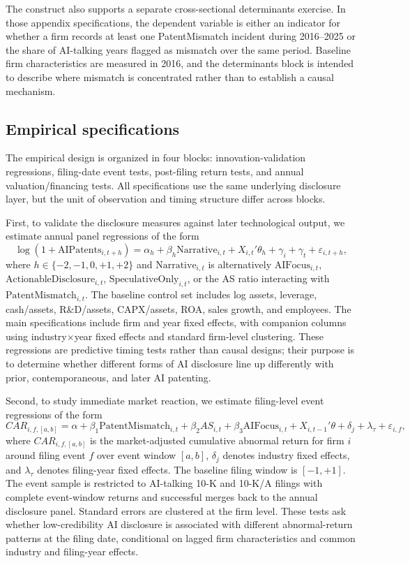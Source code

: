 The construct also supports a separate cross-sectional determinants exercise. In those appendix specifications, the dependent variable is either an indicator for whether a firm records at least one PatentMismatch incident during 2016--2025 or the share of AI-talking years flagged as mismatch over the same period. Baseline firm characteristics are measured in 2016, and the determinants block is intended to describe where mismatch is concentrated rather than to establish a causal mechanism.

\subsection{Empirical specifications}

The empirical design is organized in four blocks: innovation-validation regressions, filing-date event tests, post-filing return tests, and annual valuation/financing tests. All specifications use the same underlying disclosure layer, but the unit of observation and timing structure differ across blocks.

First, to validate the disclosure measures against later technological output, we estimate annual panel regressions of the form
\[
\log(1+\mathrm{AIPatents}_{i,t+h})
=
\alpha_h + \beta_h \mathrm{Narrative}_{i,t} + X_{i,t}'\theta_h + \gamma_i + \gamma_t + \varepsilon_{i,t+h},
\]
where $h \in \{-2,-1,0,+1,+2\}$ and $\mathrm{Narrative}_{i,t}$ is alternatively $\mathrm{AI Focus}_{i,t}$, $\mathrm{ActionableDisclosure}_{i,t}$, $\mathrm{SpeculativeOnly}_{i,t}$, or the AS ratio interacting with $\mathrm{PatentMismatch}_{i,t}$. The baseline control set includes log assets, leverage, cash/assets, R\&D/assets, CAPX/assets, ROA, sales growth, and employees. The main specifications include firm and year fixed effects, with companion columns using industry$\times$year fixed effects and standard firm-level clustering. These regressions are predictive timing tests rather than causal designs; their purpose is to determine whether different forms of AI disclosure line up differently with prior, contemporaneous, and later AI patenting.

Second, to study immediate market reaction, we estimate filing-level event regressions of the form
\[
CAR_{i,f,[a,b]}
=
\alpha + \beta_1 \mathrm{PatentMismatch}_{i,t}
+ \beta_2 AS_{i,t}
+ \beta_3 \mathrm{AI Focus}_{i,t}
+ X_{i,t-1}'\theta + \delta_{j} + \lambda_{\tau} + \varepsilon_{i,f},
\]
where $CAR_{i,f,[a,b]}$ is the market-adjusted cumulative abnormal return for firm $i$ around filing event $f$ over event window $[a,b]$, $\delta_{j}$ denotes industry fixed effects, and $\lambda_{\tau}$ denotes filing-year fixed effects. The baseline filing window is $[-1,+1]$. The event sample is restricted to AI-talking 10-K and 10-K/A filings with complete event-window returns and successful merges back to the annual disclosure panel. Standard errors are clustered at the firm level. These tests ask whether low-credibility AI disclosure is associated with different abnormal-return patterns at the filing date, conditional on lagged firm characteristics and common industry and filing-year effects.

